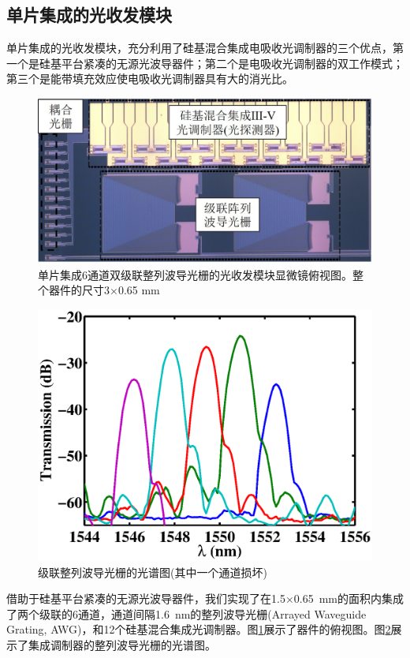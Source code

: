 \subsection{单片集成的光收发模块}
单片集成的光收发模块，充分利用了硅基混合集成电吸收光调制器的三个优点，第一个是硅基平台紧凑的无源光波导器件；第二个是电吸收光调制器的双工作模式；第三个是能带填充效应使电吸收光调制器具有大的消光比。
\begin{figure}[htb]
	\centering
	\includegraphics[width=12cm]{./Pictures/chapt4_casacade_awg_structure.jpg}
	\caption{单片集成6通道双级联整列波导光栅的光收发模块显微镜俯视图。整个器件的尺寸3$\times$0.65 mm}
	\label{chapt4_casacade_awg_structure}
\end{figure}
\begin{figure}[htb]
	\centering
	\includegraphics[width=12cm]{./Pictures/chapt4_cascade_awg_spectra.eps}
	\caption{级联整列波导光栅的光谱图(其中一个通道损坏)}
	\label{chapt4_cascade_awg_spectra}
\end{figure}
借助于硅基平台紧凑的无源光波导器件，我们实现了在1.5$\times$0.65~mm的面积内集成了两个级联的6通道，通道间隔1.6~nm的整列波导光栅(Arrayed Waveguide Grating, AWG)，和12个硅基混合集成光调制器。图\ref{chapt4_casacade_awg_structure}展示了器件的俯视图。图\ref{chapt4_cascade_awg_spectra}展示了集成调制器的整列波导光栅的光谱图。

